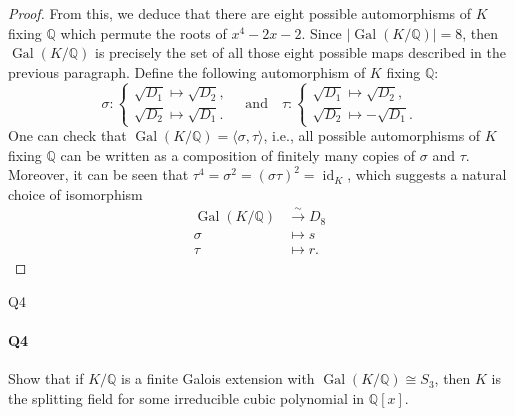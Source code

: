 \documentclass[12pt]{article}
\newenvironment{fullbox}{\begin{lrbox}{\savefullbox}\begin{minipage}{\dimexpr\textwidth-2\fboxsep\relax}}{\end{minipage}\end{lrbox}\begin{center}\framebox[\textwidth]{\usebox{\savefullbox}}\end{center}}
\newenvironment{pbox}[1][]{\begin{fullbox}\ifx#1\empty\else\paragraph{#1}\fi}{\end{fullbox}}
\theoremstyle{definition}
\newcommand{\isp}[1]{\quad\text{#1}\quad}
\newcommand{\Q}{\mathbb{Q}}
\newcommand{\<}{\langle}
\renewcommand{\>}{\rangle}
\newcommand{\isom}{\cong}
\DeclareMathOperator{\id}{id}
\DeclareMathOperator{\Gal}{Gal}
\begin{document}
\begin{proof}
    From this, we deduce that there are eight possible automorphisms of $K$ fixing $\Q$ which permute the roots of $x^4 - 2x - 2$. Since $|\Gal(K/\Q)| = 8$, then $\Gal(K/\Q)$ is precisely the set of all those eight possible maps described in the previous paragraph. Define the following automorphism of $K$ fixing $\Q$:
    \[
        \sigma : \begin{cases}
            \sqrt{D_1} \mapsto \sqrt{D_2}, \\
            \sqrt{D_2} \mapsto \sqrt{D_1}. 
        \end{cases}
        \isp{and}
        \tau : \begin{cases}
            \sqrt{D_1} \mapsto \sqrt{D_2}, \\
            \sqrt{D_2} \mapsto -\sqrt{D_1}. 
        \end{cases}
    \]
    One can check that $\Gal(K/\Q) = \<\sigma, \tau\>$, i.e., all possible automorphisms of $K$ fixing $\Q$ can be written as a composition of finitely many copies of $\sigma$ and $\tau$. Moreover, it can be seen that $\tau^4 = \sigma^2 = (\sigma\tau)^2 = \id_K$, which suggests a natural choice of isomorphism
    \begin{align*}
        \Gal(K/\Q) &\xrightarrow{\sim} D_8 \\
            \sigma &\mapsto s \\
            \tau &\mapsto r.
    \end{align*}


\end{proof}



\newpage
\begin{pbox}[Q4]
    Show that if $K/\Q$ is a finite Galois extension with $\Gal(K/\Q) \isom S_3$, then $K$ is the splitting field for some irreducible cubic polynomial in $\Q[x]$.
\end{pbox}
\end{document}
